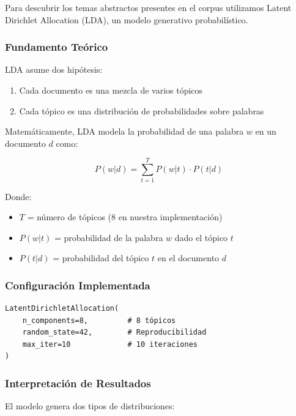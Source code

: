 Para descubrir los temas abstractos presentes en el corpus utilizamos Latent Dirichlet Allocation (LDA), un modelo generativo probabilístico.

\subsubsection{Fundamento Teórico}
\label{subsubsec:fundamento_lda}

LDA asume dos hipótesis:
\begin{enumerate}
    \item Cada documento es una mezcla de varios tópicos
    \item Cada tópico es una distribución de probabilidades sobre palabras
\end{enumerate}

Matemáticamente, LDA modela la probabilidad de una palabra $w$ en un documento $d$ como:

\begin{equation}
P(w|d) = \sum_{t=1}^{T} P(w|t) \cdot P(t|d)
\end{equation}

Donde:
\begin{itemize}
    \item $T$ = número de tópicos (8 en nuestra implementación)
    \item $P(w|t)$ = probabilidad de la palabra $w$ dado el tópico $t$
    \item $P(t|d)$ = probabilidad del tópico $t$ en el documento $d$
\end{itemize}

\subsubsection{Configuración Implementada}
\label{subsubsec:config_lda}

\begin{verbatim}
LatentDirichletAllocation(
    n_components=8,         # 8 tópicos
    random_state=42,        # Reproducibilidad
    max_iter=10             # 10 iteraciones
)
\end{verbatim}

\subsubsection{Interpretación de Resultados}
\label{subsubsec:interpretacion_lda}

El modelo genera dos tipos de distribuciones:

